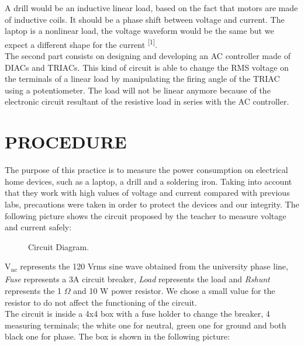 \documentclass[journal]{IEEEtran}
\begin{document}
A drill would be an inductive linear load, based on the fact that 
motors are made of inductive coils. It should be a phase shift between 
voltage and current. The laptop is a nonlinear load, the voltage 
waveform would be the same but we expect a different shape for the 
current \textsuperscript{[1]}. \\

The second part consists on designing and developing an AC controller 
made of DIACs and TRIACs. This kind of circuit is able to change the 
RMS voltage on the terminals of a linear load by manipulating the 
firing angle of the TRIAC using a potentiometer. The load will not be 
linear anymore because of the electronic circuit resultant of the 
resistive load in series with the AC controller.\\


\section{PROCEDURE}

The purpose of this practice is to measure the power consumption on 
electrical home devices, such as a laptop, a drill and a soldering 
iron. Taking into account that they work with high values of voltage 
and current compared with previous labs, precautions were taken in 
order to protect the devices and our integrity. The following picture 
shows the circuit proposed by the teacher to measure voltage and 
current safely: 

\begin{figure}[h]
\caption{Circuit Diagram.}
\label{circuit_diagram}
\end{figure}

V\textsubscript{ac} represents the 120 Vrms sine wave obtained from 
the university phase line, \textit{Fuse} represents a 3A circuit 
breaker, \textit{Load} represents the load and \textit{Rshunt} 
represents the 1 $\Omega$ and 10 W 
power resistor. We chose a small value for the resistor to do not 
affect the functioning of the circuit. \\

The circuit is inside a 4x4 box with a fuse holder to change the 
breaker, 4 measuring terminals; the white one for neutral, green one 
for ground and  both black one for phase. The box is shown in the 
following picture:
\end{document}
